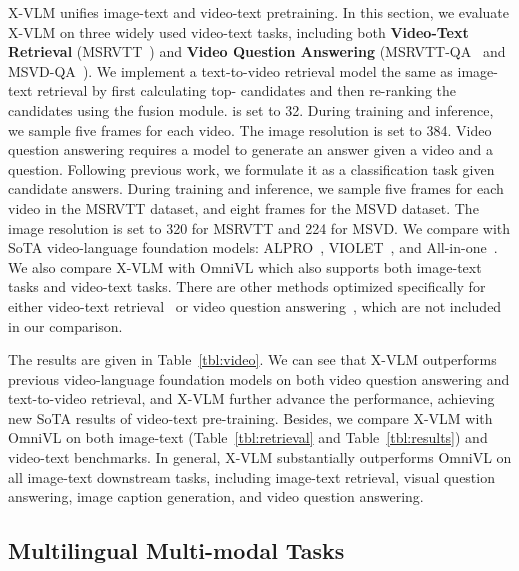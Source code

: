 \documentclass{article}
\newcommand{\baby}{X-VLM\xspace}
\newcommand{\babyB}{X-VLM\xspace}
\newcommand{\babyL}{X-VLM\xspace}
\begin{document}
\baby unifies image-text and video-text pretraining. In this section, we evaluate \baby on three widely used video-text tasks, including both \textbf{Video-Text Retrieval} (MSRVTT~\cite{xu2016msr}) and \textbf{Video Question Answering} (MSRVTT-QA~\cite{xu2017video} and MSVD-QA~\cite{xu2017video}). We implement a text-to-video retrieval model the same as image-text retrieval by first calculating top- candidates and then re-ranking the candidates using the fusion module.  is set to 32. During training and inference, we sample five frames for each video. The image resolution is set to 384. Video question answering requires a model to generate an answer given a video and a question. Following previous work, we formulate it as a classification task given candidate answers. During training and inference, we sample five frames for each video in the MSRVTT dataset, and eight frames for the MSVD dataset. The image resolution is set to 320 for MSRVTT and 224 for MSVD. We compare with SoTA video-language foundation models: ALPRO~\cite{li2022align}, VIOLET~\cite{fu2021violet}, and All-in-one~\cite{wang2022all}. We also compare \baby with OmniVL which also supports both image-text tasks and video-text tasks. There are other methods optimized specifically for either video-text retrieval~\cite{xue2022clip,min2022hunyuan_tvr} or video question answering~\cite{yang2022zero}, which are not included in our comparison. 


The results are given in Table~\ref{tbl:video}. We can see that \babyB outperforms previous video-language foundation models on both video question answering and text-to-video retrieval, and \babyL further advance the performance, achieving new SoTA results of video-text pre-training. Besides, we compare \baby with OmniVL on both image-text (Table~\ref{tbl:retrieval} and Table~\ref{tbl:results}) and video-text benchmarks. In general, \babyB substantially outperforms OmniVL on all image-text downstream tasks, including image-text retrieval, visual question answering, image caption generation, and video question answering. 





\subsection{Multilingual Multi-modal Tasks}
\end{document}
